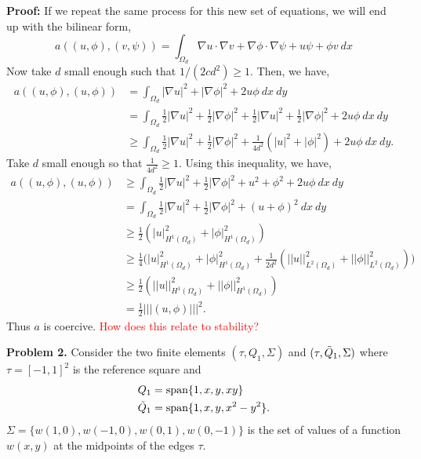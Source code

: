 \documentclass[11pt]{article}
\begin{document}
\textbf{Proof:} If we repeat the same process for this new set of equations, we will end up with the bilinear form,
\begin{equation*}
    a((u,\phi),(v,\psi)) = \int_{\Omega_d} \nabla u \cdot \nabla v + \nabla \phi \cdot \nabla \psi + u\psi + \phi v \: dx 
\end{equation*}
Now take $d$ small enough such that $1/(2cd^2) \geq 1$.
Then, we have,
\begin{align*}
    a((u,\phi),(u,\phi)) &= \int_{\Omega_d} |\nabla u|^2 + |\nabla \phi|^2 + 2 u \phi \: dx \: dy \\
    &= \int_{\Omega_d} \frac{1}{2} |\nabla u|^2 + \frac{1}{2} |\nabla \phi|^2 + \frac{1}{2} |\nabla u|^2 + \frac{1}{2} |\nabla \phi|^2 + 2u\phi \: dx \: dy \\
    &\geq \int_{\Omega_d} \frac{1}{2} |\nabla u|^2 + \frac{1}{2} |\nabla \phi|^2 + \frac{1}{4d^2}(|u|^2 + |\phi|^2) + 2 u \phi \: dx \: dy.
\end{align*}
Take $d$ small enough so that $\tfrac{1}{4d^2} \geq 1$.
Using this inequality, we have,
\begin{align*}
    a((u,\phi),(u,\phi)) & \geq \int_{\Omega_d} \frac{1}{2} |\nabla u|^2 + \frac{1}{2} |\nabla \phi|^2 + u^2 + \phi^2 + 2u\phi \: dx \: dy \\
    &= \int_{\Omega_d} \frac{1}{2} |\nabla u|^2 + \frac{1}{2} |\nabla \phi|^2 + (u + \phi)^2 \: dx \: dy \\
    &\geq \frac{1}{2} (|u|^2_{H^1(\Omega_d)} + |\phi|^2_{H^1(\Omega_d)} ) \\
    &\geq \frac{1}{4} \big( |u|^2_{H^1(\Omega_d)} + |\phi|^2_{H^1(\Omega_d)} + \frac{1}{2d^2} (||u||^2_{L^2(\Omega_d)} + ||\phi||^2_{L^2(\Omega_d)} ) \big) \\
    &\geq \frac{1}{2} (||u||^2_{H^1(\Omega_d)} + ||\phi||^2_{H^1(\Omega_d)}) \\
    &= \frac{1}{2} |||(u,\phi)|||^2.
\end{align*}
Thus $a$ is coercive. \textcolor{red}{How does this relate to stability?} 

\vskip 2cm

\textbf{Problem 2.} Consider the two finite elements $(\tau, Q_1, \Sigma)$ and $(\tau, \Tilde{Q}_1, \Sigma)$ where $\tau = [-1,1]^2$ is the reference square and 
\begin{align}
    Q_1 &= \text{span}\{1, x, y, xy \} \\ 
    \Tilde{Q}_1 &= \text{span} \{1, x, y, x^2 - y^2 \}.
\end{align}
$\Sigma = \{ w(1,0), w(-1,0), w(0,1), w(0,-1) \}$ is the set of values of a function $w(x,y)$ at the midpoints of the edges $\tau$.
\end{document}
